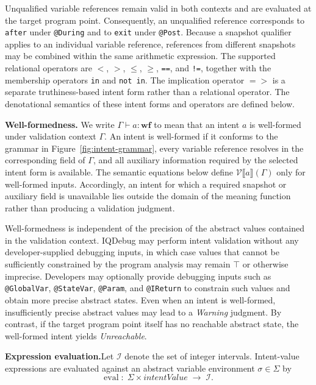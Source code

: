 \documentclass[11pt,oneside]{report}
\theoremstyle{plain}
\theoremstyle{definition}
\theoremstyle{remark}
\begin{document}
Unqualified variable references remain valid in both contexts and are evaluated at the target program point.
Consequently, an unqualified reference corresponds to \texttt{after} under \texttt{@During} and to \texttt{exit} under \texttt{@Post}.
Because a snapshot qualifier applies to an individual variable reference, references from different snapshots may be combined within the same arithmetic expression.
The supported relational operators are \(<\), \(>\), \(\leq\), \(\geq\), \texttt{==}, and \texttt{!=}, together with the membership operators \texttt{in} and \texttt{not in}.
The implication operator \({=}{>}\) is a separate truthiness-based intent form rather than a relational operator.
The denotational semantics of these intent forms and operators are defined below.

\smallskip
\noindent\textbf{Well-formedness.}
We write $\Gamma \vdash a : \mathbf{wf}$ to mean that an intent $a$ is
well-formed under validation context $\Gamma$.
An intent is well-formed if it conforms to the grammar in
Figure~\ref{fig:intent-grammar}, every variable reference resolves in the
corresponding field of $\Gamma$, and all auxiliary information required by
the selected intent form is available.
The semantic equations below define
$\mathcal{V}\llbracket a \rrbracket(\Gamma)$
only for well-formed inputs.
Accordingly, an intent for which a required snapshot or auxiliary field is
unavailable lies outside the domain of the meaning function rather than
producing a validation judgment.

Well-formedness is independent of the precision of the abstract values
contained in the validation context.
IQDebug may perform intent validation without any developer-supplied debugging
inputs, in which case values that cannot be sufficiently constrained by the
program analysis may remain $\top$ or otherwise imprecise.
Developers may optionally provide debugging inputs such as
\texttt{@GlobalVar}, \texttt{@StateVar}, \texttt{@Param}, and
\texttt{@IReturn} to constrain such values and obtain more precise abstract
states.
Even when an intent is well-formed, insufficiently precise abstract values may
lead to a \textit{Warning} judgment.
By contrast, if the target program point itself has no reachable abstract
state, the well-formed intent yields \textit{Unreachable}.

\smallskip
\noindent\textbf{Expression evaluation.}Let $\mathcal{I}$ denote the set of integer intervals.
Intent-value expressions are evaluated against an abstract variable environment
$\sigma \in \Sigma$ by
\[
\mathrm{eval}
\;:\;
\Sigma \times \mathit{intentValue}
\;\to\;
\mathcal{I}.
\]
\end{document}
